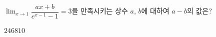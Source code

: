$\displaystyle\lim_{x\to 1}\dfrac{ax+b}{e^{x-1}-1}=3$을 만족시키는 상수 $a$, $b$에 대하여 $a-b$의 값은?
\begin{choices32}{$2$}{$4$}{$6$}{$8$}{$10$}\end{choices32}
